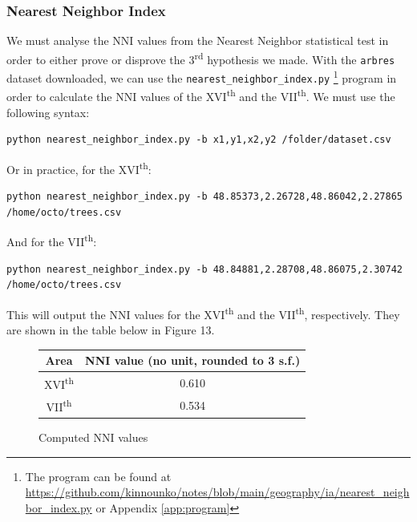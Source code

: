 \documentclass[11pt,letterpaper]{article}
\begin{document}
\subsubsection{Nearest Neighbor Index}

We must analyse the NNI values from the Nearest Neighbor statistical test in order to either prove or disprove the 3\textsuperscript{rd} hypothesis we made. With the \verb|arbres| dataset downloaded, we can use the \verb|nearest_neighbor_index.py| \footnote{The program can be found at \url{https://github.com/kinnounko/notes/blob/main/geography/ia/nearest_neighbor_index.py} or Appendix \ref{app:program}} program in order to calculate the NNI values of the XVI\textsuperscript{th} and the VII\textsuperscript{th}. We must use the following syntax:

\begin{lstlisting}[breaklines]
    python nearest_neighbor_index.py -b x1,y1,x2,y2 /folder/dataset.csv
\end{lstlisting}

Or in practice, for the XVI\textsuperscript{th}:
\begin{lstlisting}[breaklines]
    python nearest_neighbor_index.py -b 48.85373,2.26728,48.86042,2.27865 /home/octo/trees.csv
\end{lstlisting}

And for the VII\textsuperscript{th}:
\begin{lstlisting}[breaklines]
    python nearest_neighbor_index.py -b 48.84881,2.28708,48.86075,2.30742 /home/octo/trees.csv
\end{lstlisting}

This will output the NNI values for the XVI\textsuperscript{th} and the VII\textsuperscript{th}, respectively. They are shown in the table below in Figure 13.

\begin{figure}[H]
    \begin{center}
        \begin{tabular}{||c c||}
            \hline
            Area                    & NNI value (no unit, rounded to 3 s.f.) \\ [0.5ex]
            \hline\hline
            XVI\textsuperscript{th} & 0.610                       \\
            \hline
            VII\textsuperscript{th} & 0.534                       \\ [1ex]
            \hline
        \end{tabular}
    \end{center}
    \caption{Computed NNI values}
\end{figure}
\end{document}
